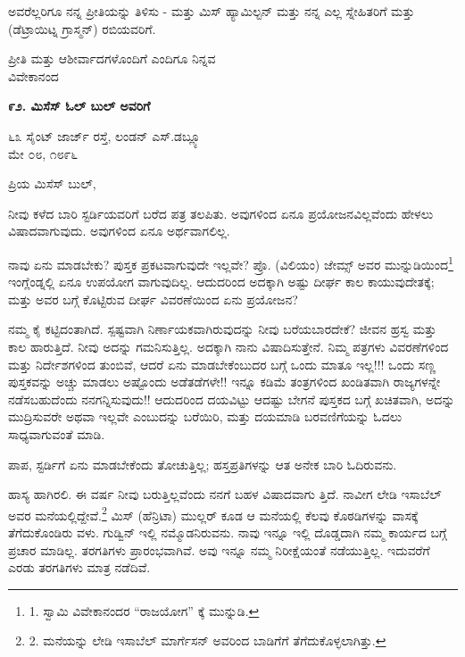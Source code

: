ಅವರೆಲ್ಲರಿಗೂ ನನ್ನ ಪ್ರೀತಿಯನ್ನು ತಿಳಿಸು - ಮತ್ತು ಮಿಸ್ ಹ್ಯಾಮಿಲ್ಟನ್ ಮತ್ತು ನನ್ನ ಎಲ್ಲ ಸ್ನೇಹಿತರಿಗೆ ಮತ್ತು (ಡೆಟ್ರಾಯಿಟ್ನ ಗ್ರಾಸ್ಮನ್) ರಬಿಯವರಿಗೆ.

\begin{flushright}
ಪ್ರೀತಿ ಮತ್ತು ಆಶೀರ್ವಾದಗಳೊಂದಿಗೆ ಎಂದಿಗೂ ನಿನ್ನವ\\ವಿವೇಕಾನಂದ
\end{flushright}

\begin{center}
\textbf{೯೨. ಮಿಸೆಸ್ ಓಲ್ ಬುಲ್ ಅವರಿಗೆ}
\end{center}

\begin{flushright}
೬೩ ಸೈಂಟ್ ಜಾರ್ಜ್ ರಸ್ತೆ, ಲಂಡನ್ ಎಸ್.ಡಬ್ಲ್ಯೂ\\ಮೇ ೦೮, ೧೮೯೬
\end{flushright}

ಪ್ರಿಯ ಮಿಸೆಸ್ ಬುಲ್,

ನೀವು ಕಳೆದ ಬಾರಿ ಸ್ಟರ್ಡಿಯವರಿಗೆ ಬರೆದ ಪತ್ರ ತಲಪಿತು. ಅವುಗಳಿಂದ ಏನೂ ಪ್ರಯೋಜನವಿಲ್ಲವೆಂದು ಹೇಳಲು ವಿಷಾದವಾಗುವುದು. ಅವುಗಳಿಂದ ಏನೂ ಅರ್ಥವಾಗಲಿಲ್ಲ.

ನಾವು ಏನು ಮಾಡಬೇಕು? ಪುಸ್ತಕ ಪ್ರಕಟವಾಗುವುದೇ ಇಲ್ಲವೇ? ಪ್ರೊ. (ವಿಲಿಯಂ) ಜೇಮ್ಸ್ ಅವರ ಮುನ್ನುಡಿಯಿಂದ\footnote{1. ಸ್ವಾಮಿ ವಿವೇಕಾನಂದರ “ರಾಜಯೋಗ” ಕ್ಕೆ ಮುನ್ನುಡಿ.} ಇಂಗ್ಲೆಂಡ್ನಲ್ಲಿ ಏನೂ ಉಪಯೋಗ ವಾಗುವುದಿಲ್ಲ. ಆದುದರಿಂದ ಅದಕ್ಕಾಗಿ ಅಷ್ಟು ದೀರ್ಘ ಕಾಲ ಕಾಯುವುದೇತಕ್ಕೆ; ಮತ್ತು ಅವರ ಬಗ್ಗೆ ಕೊಟ್ಟಿರುವ ದೀರ್ಘ ವಿವರಣೆಯಿಂದ ಏನು ಪ್ರಯೋಜನ?

ನಮ್ಮ ಕೈ ಕಟ್ಟಿದಂತಾಗಿದೆ. ಸ್ಪಷ್ಟವಾಗಿ ನಿರ್ಣಾಯಕವಾಗಿರುವುದನ್ನು ನೀವು ಬರೆಯಬಾರದೇಕೆ? ಜೀವನ ಹ್ರಸ್ವ ಮತ್ತು ಕಾಲ ಹಾರುತ್ತಿದೆ. ನೀವು ಅದನ್ನು ಗಮನಿಸುತ್ತಿಲ್ಲ. ಅದಕ್ಕಾಗಿ ನಾನು ವಿಷಾದಿಸುತ್ತೇನೆ. ನಿಮ್ಮ ಪತ್ರಗಳು ವಿವರಣೆಗಳಿಂದ ಮತ್ತು ನಿರ್ದೇಶಗಳಿಂದ ತುಂಬಿವೆ, ಆದರೆ ಏನು ಮಾಡಬೇಕೆಂಬುದರ ಬಗ್ಗೆ ಒಂದು ಮಾತೂ ಇಲ್ಲ!!! ಒಂದು ಸಣ್ಣ ಪುಸ್ತಕವನ್ನು ಅಚ್ಚು ಮಾಡಲು ಅಷ್ಟೊಂದು ಅಡೆತಡೆಗಳೇ!! ಇನ್ನೂ ಕಡಿಮೆ ತಂತ್ರಗಳಿಂದ ಖಂಡಿತವಾಗಿ ರಾಜ್ಯಗಳನ್ನೇ ನಡೆಸಬಹುದೆಂದು ನನಗನ್ನಿಸುವುದು!! ಆದುದರಿಂದ ದಯವಿಟ್ಟು ಆದಷ್ಟು ಬೇಗನೆ ಪುಸ್ತಕದ ಬಗ್ಗೆ ಖಚಿತವಾಗಿ, ಅದನ್ನು ಮುದ್ರಿಸುವರೇ ಅಥವಾ ಇಲ್ಲವೇ ಎಂಬುದನ್ನು ಬರೆಯಿರಿ, ಮತ್ತು ದಯಮಾಡಿ ಬರವಣಿಗೆಯನ್ನು ಓದಲು ಸಾಧ್ಯವಾಗುವಂತೆ ಮಾಡಿ.

ಪಾಪ, ಸ್ಟರ್ಡಿಗೆ ಏನು ಮಾಡಬೇಕೆಂದು ತೋಚುತ್ತಿಲ್ಲ; ಹಸ್ತಪ್ರತಿಗಳನ್ನು ಆತ ಅನೇಕ ಬಾರಿ ಓದಿರುವನು.

ಹಾಸ್ಯ ಹಾಗಿರಲಿ. ಈ ವರ್ಷ ನೀವು ಬರುತ್ತಿಲ್ಲವೆಂದು ನನಗೆ ಬಹಳ ವಿಷಾದವಾಗು ತ್ತಿದೆ. ನಾವೀಗ ಲೇಡಿ ಇಸಾಬೆಲ್ ಅವರ ಮನೆಯಲ್ಲಿದ್ದೇವೆ.\footnote{2. ಮನೆಯನ್ನು ಲೇಡಿ ಇಸಾಬೆಲ್ ಮಾರ್ಗೆಸನ್ ಅವರಿಂದ ಬಾಡಿಗೆಗೆ ತೆಗೆದುಕೊಳ್ಳಲಾಗಿತ್ತು.} ಮಿಸ್ (ಹೆನ್ರಿಟಾ) ಮುಲ್ಲರ್ ಕೂಡ ಆ ಮನೆಯಲ್ಲಿ ಕೆಲವು ಕೊಠಡಿಗಳನ್ನು ವಾಸಕ್ಕೆ ತೆಗೆದುಕೊಂಡಿರು ವಳು. ಗುಡ್ವಿನ್ ಇಲ್ಲಿ ನಮ್ಮೊಡನಿರುವನು. ನಾವು ಇನ್ನೂ ಇಲ್ಲಿ ದೊಡ್ಡದಾಗಿ ನಮ್ಮ ಕಾರ್ಯದ ಬಗ್ಗೆ ಪ್ರಚಾರ ಮಾಡಿಲ್ಲ. ತರಗತಿಗಳು ಪ್ರಾರಂಭವಾಗಿವೆ. ಅವು ಇನ್ನೂ ನಮ್ಮ ನಿರೀಕ್ಷೆಯಂತೆ ನಡೆಯುತ್ತಿಲ್ಲ. ಇದುವರೆಗೆ ಎರಡು ತರಗತಿಗಳು ಮಾತ್ರ ನಡೆದಿವೆ.

